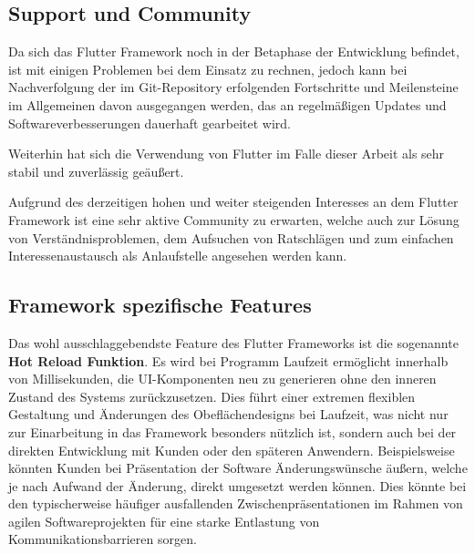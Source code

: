 \documentclass[bibliography=totoc,listof=totoc,BCOR=5mm,DIV=12,oneside]{scrbook}
\begin{document}
\subsection{Support und Community}
\par Da sich das Flutter Framework noch in der Betaphase der Entwicklung befindet, ist mit einigen Problemen bei dem Einsatz zu rechnen, jedoch kann bei Nachverfolgung der im Git-Repository erfolgenden Fortschritte und Meilensteine im Allgemeinen davon ausgegangen werden, das an regelmäßigen Updates und Softwareverbesserungen dauerhaft gearbeitet wird.
\par \bigskip Weiterhin hat sich die Verwendung von Flutter im Falle dieser Arbeit als sehr stabil und zuverlässig geäußert.
\par \bigskip Aufgrund des derzeitigen hohen und weiter steigenden Interesses an dem Flutter Framework ist eine sehr aktive Community zu erwarten, welche auch zur Lösung von Verständnisproblemen, dem Aufsuchen von Ratschlägen und zum einfachen Interessenaustausch als Anlaufstelle angesehen werden kann.

\subsection{Framework spezifische Features}
\par Das wohl ausschlaggebendste Feature des Flutter Frameworks ist die sogenannte \textbf{Hot Reload Funktion}. Es wird bei Programm Laufzeit ermöglicht innerhalb von Millisekunden, die UI-Komponenten neu zu generieren ohne den inneren Zustand des Systems zurückzusetzen. Dies führt einer extremen flexiblen Gestaltung und Änderungen des Obeflächendesigns bei Laufzeit, was nicht nur zur Einarbeitung in das Framework besonders nützlich ist, sondern auch bei der direkten Entwicklung mit Kunden oder den späteren Anwendern. Beispielsweise könnten Kunden bei Präsentation der Software Änderungswünsche äußern, welche je nach Aufwand der Änderung, direkt umgesetzt werden können. Dies könnte bei den typischerweise häufiger ausfallenden Zwischenpräsentationen im Rahmen von agilen Softwareprojekten für eine starke Entlastung von Kommunikationsbarrieren sorgen.
\end{document}
